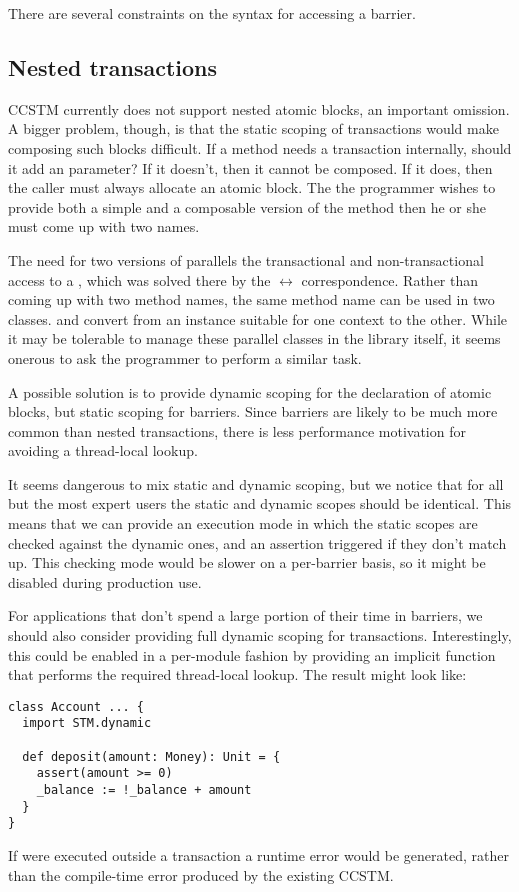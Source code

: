 There are several constraints on the syntax for accessing a barrier.  

\subsection{Nested transactions}

CCSTM currently does not support nested atomic blocks, an important
omission.  A bigger problem, though, is that the static scoping
of transactions would make composing such blocks difficult.  If a
method  needs a transaction internally, should it add an
  parameter?  If it doesn't, then it
cannot be composed.  If it does, then the caller must always allocate
an atomic block.  The the programmer wishes to provide both a simple
and a composable version of the method then he or she must come up with
two names.

The need for two versions of  parallels the transactional and
non-transactional access to a , which was solved there by the
 $\leftrightarrow$  correspondence.  Rather than
coming up with two method names, the same method name can be used in
two classes.   and 
convert from an instance suitable for one context to the other.  While it
may be tolerable to manage these parallel classes in the library itself,
it seems onerous to ask the programmer to perform a similar task.

A possible solution is to provide dynamic scoping for the declaration
of atomic blocks, but static scoping for barriers.  Since barriers are
likely to be much more common than nested transactions, there is less
performance motivation for avoiding a thread-local lookup.

It seems dangerous to mix static and dynamic scoping, but we notice that
for all but the most expert users the static and dynamic scopes should be
identical.  This means that we can provide an execution mode in which the
static scopes are checked against the dynamic ones, and an assertion triggered
if they don't match up.  This checking mode would be slower on a per-barrier
basis, so it might be disabled during production use.

For applications that don't spend a large portion of their time in barriers, we
should also consider providing full dynamic scoping for transactions.
Interestingly, this could be enabled in a per-module fashion by providing an
implicit function that performs the required thread-local lookup.  The result
might look like:
\lstset{numbers=none}
\begin{lstlisting}
class Account ... {
  import STM.dynamic

  def deposit(amount: Money): Unit = {
    assert(amount >= 0)
    _balance := !_balance + amount
  }
}
\end{lstlisting}
\lstset{numbers=left}
If  were executed outside a transaction a runtime error would be
generated, rather than the compile-time error produced by the existing CCSTM.

